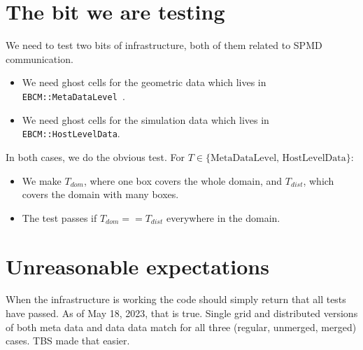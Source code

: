 \documentclass{article}
\begin{document}
\section{The bit we are testing}

We need to test two bits of infrastructure, both of them related to
SPMD communication.  
\begin{itemize}
  \item We need ghost cells for the geometric data which lives in {\tt
    EBCM::MetaDataLevel }.
  \item We need ghost cells for the simulation data which lives in {\tt
    EBCM::HostLevelData}.
\end{itemize}
In both cases, we do the obvious test.
For $T \in \{\mbox{MetaDataLevel, HostLevelData} \}$:
\begin{itemize}
  \item We make $T_{dom}$, where one box covers the whole domain, and
    $T_{dist}$, which covers the domain with many boxes.
  \item The test passes if $T_{dom} == T_{dist}$ everywhere in the domain.
\end{itemize}

\section{Unreasonable expectations}

When the infrastructure is working the code should simply return that
all tests have passed.   As of May 18, 2023, that is true.   Single
grid and distributed versions of both meta data and data data match
for all three (regular, unmerged, merged) cases.   TBS made that easier.


\renewcommand{\thefootnote}{\fnsymbol{footnote}}\

\end{document}

